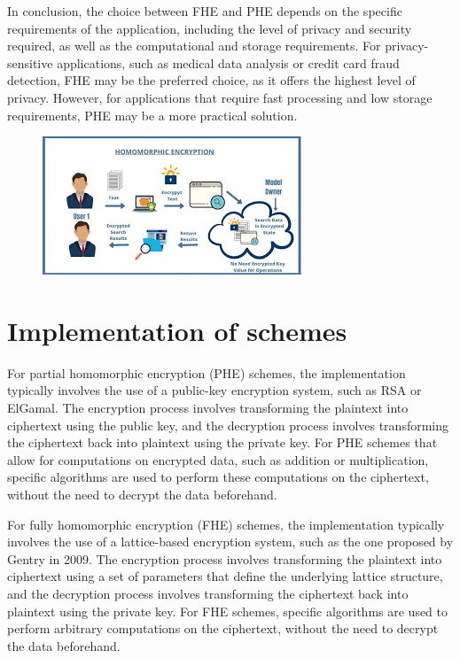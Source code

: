 \documentclass[a4paper,11pt]{report}
\begin{document}
In conclusion, the choice between FHE and PHE depends on the specific requirements of the application, including the level of privacy and security required, as well as the computational and storage requirements. For privacy-sensitive applications, such as medical data analysis or credit card fraud detection, FHE may be the preferred choice, as it offers the highest level of privacy. However, for applications that require fast processing and low storage requirements, PHE may be a more practical solution.
\begin{figure}[h]
	\centering
	\hspace{21pt}
	\includegraphics[width=.70\linewidth]{he.jpg}
	\label{fig:he.jpg}
\end{figure}
\section{Implementation of schemes}
For partial homomorphic encryption (PHE) schemes, the implementation typically involves the use of a public-key encryption system, such as RSA or ElGamal. The encryption process involves transforming the plaintext into ciphertext using the public key, and the decryption process involves transforming the ciphertext back into plaintext using the private key. For PHE schemes that allow for computations on encrypted data, such as addition or multiplication, specific algorithms are used to perform these computations on the ciphertext, without the need to decrypt the data beforehand.

For fully homomorphic encryption (FHE) schemes, the implementation typically involves the use of a lattice-based encryption system, such as the one proposed by Gentry in 2009. The encryption process involves transforming the plaintext into ciphertext using a set of parameters that define the underlying lattice structure, and the decryption process involves transforming the ciphertext back into plaintext using the private key. For FHE schemes, specific algorithms are used to perform arbitrary computations on the ciphertext, without the need to decrypt the data beforehand.
\end{document}
